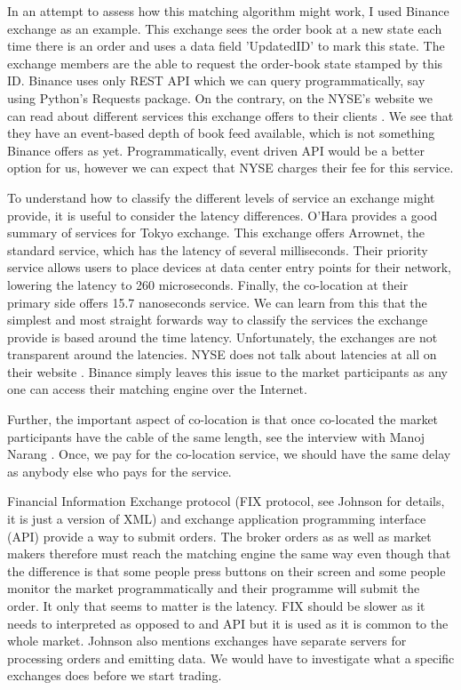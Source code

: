 \documentclass[12pt]{article}
\begin{document}
In an attempt to assess how this matching algorithm might work, I used Binance exchange as an example. This exchange sees the order book at a new state each time there is an order and uses a data field 'UpdatedID' to mark this state. The exchange members are the able to request the order-book state stamped by this ID. Binance uses only REST API which we can query programmatically, say using Python's Requests package. On the contrary, on the NYSE's website we can read about different services this exchange offers to their clients \cite{nyse}. We see that they have an event-based depth of book feed available, which is not something Binance offers as yet. Programmatically, event driven API would be a better option for us, however we can expect that NYSE charges their fee for this service.

To understand how to classify the different levels of service an exchange might provide, it is useful to consider the latency differences. O'Hara \cite{ohara} provides a good summary of services for Tokyo exchange. This exchange offers Arrownet, the standard service, which has the latency of several milliseconds. Their priority service allows users to place devices at data center entry points for their network, lowering the latency to  260 microseconds. Finally, the co-location at their primary side offers 15.7 nanoseconds service. We can learn from this that the simplest and most straight forwards way to classify the services the exchange provide is based around the time latency. Unfortunately, the exchanges are not transparent around the latencies. NYSE does not talk about latencies at all on their website \cite{nyse}. Binance simply leaves this issue to the market participants as any one can access their matching engine over the Internet.

Further, the important aspect of co-location is that once co-located the market participants have the cable of the same length, see the interview with Manoj Narang \cite{reuters}. Once, we pay for the co-location service, we should have the same delay as anybody else who pays for the service.

Financial Information Exchange protocol (FIX protocol, see Johnson \cite{johnson} for details, it is just a version of XML) and exchange application programming interface (API) provide a way to submit orders. The broker orders as as well as market makers therefore must reach the matching engine the same way even though that the difference is that some people press buttons on their screen and some people monitor the market programmatically and their programme will submit the order. It only that seems to matter is the latency. FIX should be slower as it needs to interpreted as opposed to and API but it is used as it is common to the whole market. Johnson also \cite{johnson} mentions exchanges have separate servers for processing orders and emitting data. We would have to investigate what a specific exchanges does before we start trading.
\end{document}
